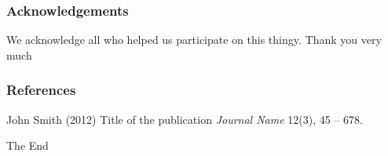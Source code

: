 \documentclass{beamer}
\begin{document}
\begin{frame}
\frametitle{Acknowledgements}
We acknowledge all who helped us participate on this thingy. Thank you very much
\end{frame}


















\begin{frame}
\frametitle{References}
\footnotesize{
\begin{thebibliography}{99} %
 John Smith (2012)
\newblock Title of the publication
\newblock \emph{Journal Name} 12(3), 45 -- 678.
\end{thebibliography}
}
\end{frame}


\begin{frame}
\Huge{\centerline{The End}}
\end{frame}

\end{document}
